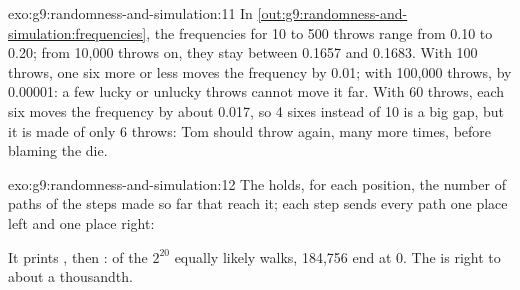 \begin{solution}{exo:g9:randomness-and-simulation:11}
In \cref{out:g9:randomness-and-simulation:frequencies}, the frequencies for 10
to 500 throws range from 0.10 to 0.20; from 10,000 throws on, they stay between
0.1657 and 0.1683. With 100 throws, one six more or less moves the frequency by
0.01; with 100,000 throws, by 0.00001: a few lucky or unlucky throws cannot
move it far. With 60 throws, each six moves the frequency by about 0.017, so 4
sixes instead of 10 is a big gap, but it is made of only 6 throws: Tom should
throw again, many more times, before blaming the die.
\end{solution}

\begin{solution}{exo:g9:randomness-and-simulation:12}
The   holds, for each position, the number of paths of the
steps made so far that reach it; each step sends every path one place left and
one place right:

\label{lst:g9:randomness-and-simulation:sol-return}

It prints , then : of the $2^{20}$ equally likely walks, 184,756 end at 0. The 
is right to about a thousandth.
\end{solution}

